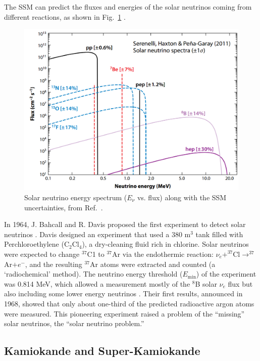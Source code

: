 The SSM can predict the fluxes and energies of the solar neutrinos coming from different reactions, as shown in Fig.~\ref{fig:haxton2013plot} \cite{haxton2013solar}.

\begin{figure}[htbp]
	\centering	
	\includegraphics[width=12cm]{haxton09.png}
	\caption[Solar neutrino energy spectrum.]{Solar neutrino energy spectrum ($E_\nu$ vs. flux) along with the SSM uncertainties, from Ref.~\cite{haxton2013solar}.}
	\label{fig:haxton2013plot}
\end{figure}
In 1964, J. Bahcall and R. Davis proposed the first experiment to detect solar neutrinos \cite{bahcall1964solar,davis1964solar}. Davis designed an experiment that used a 380 m$^3$ tank filled with Perchloroethylene (C$_2$Cl$_4$), a dry-cleaning fluid rich in chlorine. Solar neutrinos were expected to change $^{37}$C1 to $^{37}$Ar via the endothermic reaction: $\nu_e+^{37}$Cl$\to^{37}$Ar$+e^-$, and the resulting $^{37}$Ar atoms were extracted and counted (a `radiochemical' method). The neutrino energy threshold ($E_{\mathrm{min}}$) of the experiment was 0.814 MeV, which allowed a measurement mostly of the $^8$B solar $\nu_e$ flux but also including some lower energy neutrinos \cite{davis1964solar}. Their first results, announced in 1968, showed that only about one-third of the predicted radioactive argon atoms were measured\cite{davis1968search}. This pioneering experiment raised a problem of the ``missing'' solar neutrinos, the ``solar neutrino problem.''

\subsection{Kamiokande and Super-Kamiokande}\label{sect:superKsolarnu}

